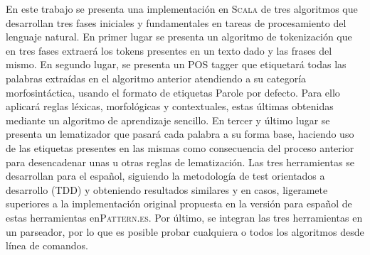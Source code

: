 
En este trabajo se presenta una implementación en \textsc{Scala} de tres algoritmos que desarrollan tres fases iniciales y fundamentales en tareas de procesamiento del lenguaje natural. En primer lugar se presenta un algoritmo de tokenización que en tres fases extraerá los tokens presentes en un texto dado y las frases del mismo. En segundo lugar, se presenta un POS tagger que etiquetará todas las palabras extraídas en el algoritmo anterior atendiendo a su categoría morfosintáctica, usando el formato de etiquetas \textsf{Parole} por defecto. Para ello aplicará reglas léxicas, morfológicas y contextuales, estas últimas obtenidas mediante un algoritmo de aprendizaje sencillo. En tercer y último lugar se presenta un lematizador que pasará cada palabra a su forma base, haciendo uso de las etiquetas presentes en las mismas como consecuencia del proceso anterior para desencadenar unas u otras reglas de lematización. 
\newline
Las tres herramientas se desarrollan para el español, siguiendo la metodología de test orientados a desarrollo (TDD) y obteniendo resultados similares y en casos, ligeramete superiores a la implementación original propuesta en la versión para español de estas herramientas en\textsc{Pattern.es}. Por último, se integran las tres herramientas en un parseador, por lo que es posible probar cualquiera o todos los algoritmos desde línea de comandos. 





